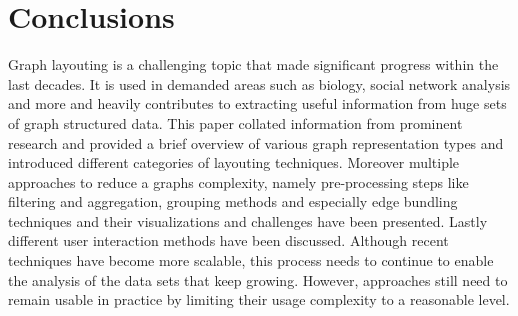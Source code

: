\section{Conclusions}
Graph layouting is a challenging topic that made significant progress within the last decades. It is used in demanded areas such as biology, social network analysis and more and heavily contributes to extracting useful information from huge sets of graph structured data. This paper collated information from prominent research and provided a brief overview of various graph representation types and introduced different categories of layouting techniques. Moreover multiple approaches to reduce a graphs complexity, namely pre-processing steps like filtering and aggregation, grouping methods and especially edge bundling techniques and their visualizations and challenges have been presented. Lastly different user interaction methods have been discussed. Although recent techniques have become more scalable, this process needs to continue to enable the analysis of the data sets that keep growing. However, approaches still need to remain usable in practice by  limiting their usage complexity to a reasonable level.



%








